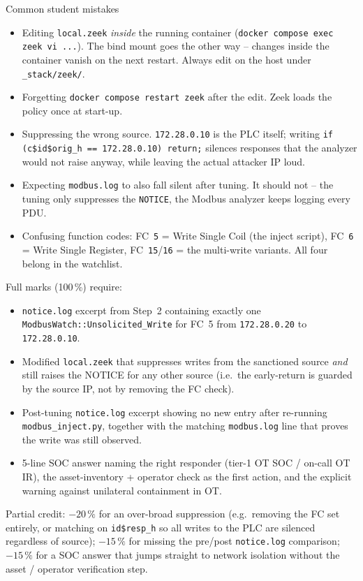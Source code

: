 \documentclass[11pt,a4paper]{article}
\begin{document}
\begin{solutionbox}{Common student mistakes}
\begin{itemize}[leftmargin=*, nosep]
  \item Editing \texttt{local.zeek} \emph{inside} the running container
        (\texttt{docker compose exec zeek vi ...}). The bind mount goes
        the other way -- changes inside the container vanish on the
        next restart. Always edit on the host under
        \texttt{\_stack/zeek/}.
  \item Forgetting \texttt{docker compose restart zeek} after the edit.
        Zeek loads the policy once at start-up.
  \item Suppressing the wrong source. \texttt{172.28.0.10} is the PLC
        itself; writing \texttt{if (c\$id\$orig\_h == 172.28.0.10)
        return;} silences responses that the analyzer would not raise
        anyway, while leaving the actual attacker IP loud.
  \item Expecting \texttt{modbus.log} to also fall silent after tuning.
        It should not -- the tuning only suppresses the
        \texttt{NOTICE}, the Modbus analyzer keeps logging every PDU.
  \item Confusing function codes: FC~\texttt{5} = Write Single Coil
        (the inject script), FC~\texttt{6} = Write Single Register,
        FC~\texttt{15}/\texttt{16} = the multi-write variants. All four
        belong in the watchlist.
\end{itemize}
\end{solutionbox}

\begin{rubricbox}
Full marks (100\,\%) require:
\begin{itemize}[leftmargin=*, nosep]
  \item \texttt{notice.log} excerpt from Step~2 containing exactly one
        \texttt{ModbusWatch::Unsolicited\_Write} for FC~5 from
        \texttt{172.28.0.20} to \texttt{172.28.0.10}.
  \item Modified \texttt{local.zeek} that suppresses writes from the
        sanctioned source \emph{and} still raises the NOTICE for any
        other source (i.e.\ the early-return is guarded by the source
        IP, not by removing the FC check).
  \item Post-tuning \texttt{notice.log} excerpt showing no new entry
        after re-running \texttt{modbus\_inject.py}, together with the
        matching \texttt{modbus.log} line that proves the write was
        still observed.
  \item 5-line SOC answer naming the right responder (tier-1 OT SOC /
        on-call OT IR), the asset-inventory + operator check as the
        first action, and the explicit warning against unilateral
        containment in OT.
\end{itemize}
Partial credit: $-20\,\%$ for an over-broad suppression (e.g.\ removing
the FC set entirely, or matching on \texttt{id\$resp\_h} so all writes
to the PLC are silenced regardless of source); $-15\,\%$ for missing
the pre/post \texttt{notice.log} comparison; $-15\,\%$ for a SOC answer
that jumps straight to network isolation without the asset / operator
verification step.
\end{rubricbox}
\end{document}
